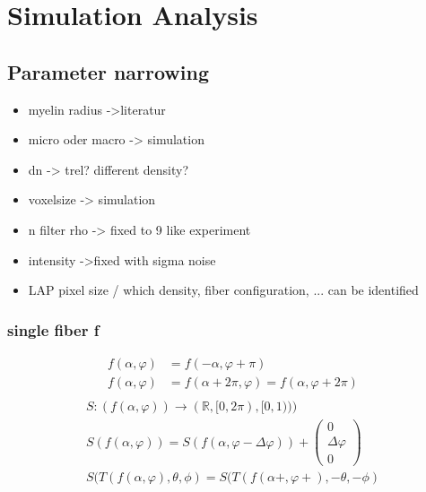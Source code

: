 \setcounter{chapter}{8}
\chapter{Simulation Analysis}
\label{cha:simulation_analysis}
% 
% 
\section{Parameter narrowing}
% 
\begin{itemize}
    \item myelin radius ->literatur
    \item micro oder macro -> simulation
    \item dn -> trel? different density?
    \item voxelsize -> simulation
    \item n filter rho -> fixed to 9 like experiment
    \item intensity ->fixed with sigma noise
    \item LAP pixel size / which density, fiber configuration, ... can be identified
\end{itemize}
% 
% 

\subsection{single fiber f}
\begin{align*}
    f(\alpha, \varphi) &= f(-\alpha, \varphi + \pi)\\
    f(\alpha, \varphi) &= f(\alpha+2\pi, \varphi)  = f(\alpha, \varphi+2\pi)\\
\end{align*}
\begin{align*}
    S:(f(\alpha, \varphi)) \rightarrow (\mathbb{R}, [0, 2 \pi), [0, 1)))\\
    S(f(\alpha, \varphi)) = S(f(\alpha, \varphi - \Delta\varphi)) + \begin{pmatrix}0\\ \Delta \varphi\\ 0\end{pmatrix}\\
    S(T(f(\alpha, \varphi), \theta, \phi) = S(T(f(\alpha+, \varphi+), -\theta, -\phi)
\end{align*}
% 

